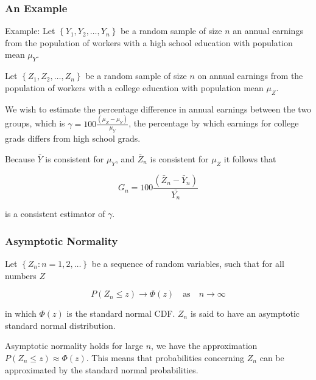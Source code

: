 \documentclass[12pt]{beamer}
\begin{document}
\begin{frame}[shrink=10]
\frametitle{An Example}
Example: Let $\left\{Y_{1}, Y_{2}, \ldots, Y_{n} \right\}$ be a random sample of size $n$ an annual
earnings from the population of workers with a high school education with population mean $\mu_{Y}$.

\vspace{2mm}
Let $\left\{Z_{1}, Z_{2}, \ldots, Z_{n} \right\}$ be a random sample of size $n$ on annual earnings 
from the population of workers with a college education with population mean $\mu_{Z}$.

\vspace{2mm}
We wish to estimate the percentage difference in annual earnings between the two groups, which is
$\gamma = 100 \frac{(\mu_{Z} - \mu_{Y})}{\mu_{Y}}$, the percentage by which earnings for college 
grads differs from high school grads.

\vspace{2mm}
Because $\bar{Y}$ is consistent for $\mu_{Y}$, and $\bar{Z}_{n}$ is consistent for $\mu_{Z}$ it follows
that 

\vspace{2mm}
\begin{equation*}
G_{n} = 100 \frac{(\bar{Z}_{n} - \bar{Y}_{n})}{\bar{Y_{n}}} 
\end{equation*}

\vspace{2mm}
is a consistent estimator of $\gamma$.
\end{frame}


\begin{frame}
\frametitle{Asymptotic Normality}
Let $\left\{Z_{n}: n = 1, 2, \ldots \right\}$ be a sequence of random variables, such that for all 
numbers $Z$

\begin{equation*}
P(Z_{n} \leq z) \rightarrow \Phi(z) \quad \mbox{as} \quad n \rightarrow \infty
\end{equation*}

\vspace{2mm}
in which $\Phi(z)$ is the standard normal CDF. $Z_{n}$ is said to have an asymptotic standard normal
distribution. 

\vspace{2mm}
Asymptotic normality holds for large $n$, we have the approximation $P(Z_{n} \leq z) \approx \Phi(z)$. 
This means that probabilities concerning $Z_{n}$ can be approximated by the standard normal probabilities.
\end{frame}
\end{document}
